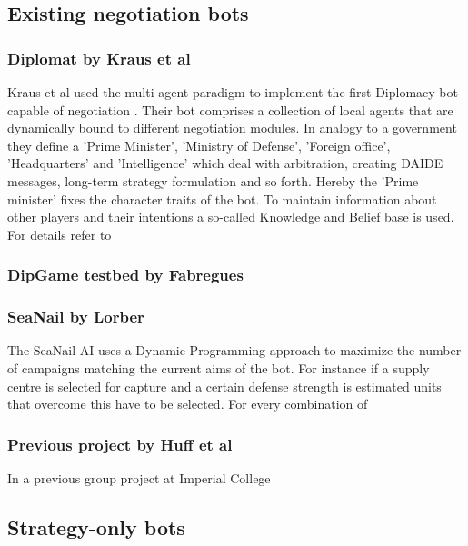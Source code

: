 \documentclass[pdftex,12pt,a4paper]{report}
\begin{document}
\subsection{Existing negotiation bots}

\subsubsection{Diplomat by Kraus et al}

Kraus et al used the multi-agent paradigm to implement the first
Diplomacy bot capable of negotiation \cite{Kraus95}. Their bot
comprises a collection of local agents that are dynamically bound to
different negotiation modules. In analogy to a government they define
a 'Prime Minister', 'Ministry of Defense', 'Foreign office',
'Headquarters' and 'Intelligence' which deal with arbitration,
creating DAIDE messages, long-term strategy formulation and so
forth. Hereby the 'Prime minister' fixes the character traits of the
bot. To maintain information about other players and their intentions
a so-called Knowledge and Belief base is used. For details refer to
\cite{Kraus88}

\subsubsection{DipGame testbed by Fabregues}

\subsubsection{SeaNail by Lorber}

The SeaNail AI \cite{Lorber98} uses a Dynamic Programming approach to
maximize the number of campaigns matching the current aims of the
bot. For instance if a supply centre is selected for capture and a
certain defense strength is estimated units that overcome this have to
be selected. For every combination of

\subsubsection{Previous project by Huff et al}

In a previous group project at Imperial College \cite{Huff05}

\subsection{Strategy-only bots}
\end{document}
